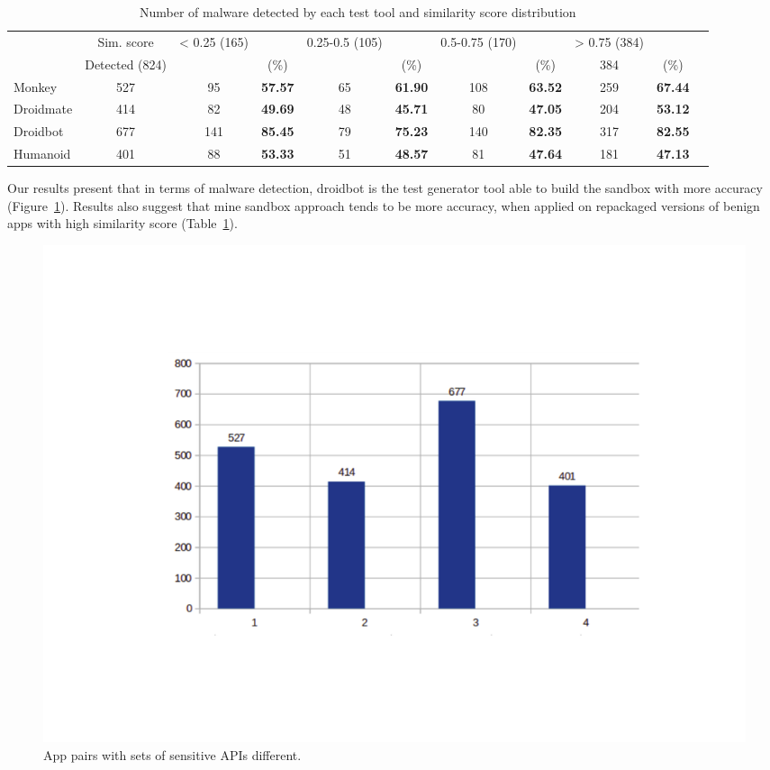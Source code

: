 \begin{table}[t]
  \caption{Number of malware detected by each test tool and similarity score distribution}
  \centering
  \begin{small}
 \begin{tabular}{lcccccccccc}
 \toprule 
    & Sim. score & < 0.25 (165) & & 0.25-0.5 (105) & & 0.5-0.75 (170) & & > 0.75 (384) & &\\  
    & Detected (824) &  & (\%) &  & (\%) &  & (\%) & 384 & (\%)\\  
    \midrule
   Monkey & 527  & 95 & \textbf{57.57} & 65 & \textbf{61.90} & 108 & \textbf{63.52} & 259 & \textbf{67.44}\\ 
   Droidmate &  414 & 82 & \textbf{49.69} & 48 & \textbf{45.71} & 80 & \textbf{47.05} & 204 & \textbf{53.12}\\ 
   Droidbot &  677 & 141 & \textbf{85.45} & 79 & \textbf{75.23} & 140 & \textbf{82.35} & 317 & \textbf{82.55}\\ 
   Humanoid &  401 & 88 & \textbf{53.33} & 51 & \textbf{48.57} & 81 & \textbf{47.64} & 181 & \textbf{47.13}\\ 
 \bottomrule
 \end{tabular}
 \end{small}
 \label{tab:mfb}
\end{table}

\begin{obs}{1}{}
   Our results present that in terms of malware detection, droidbot is the test generator tool able to build the sandbox with more accuracy (Figure~\ref{fig:accuracy}). Results also suggest that mine sandbox approach tends to be more accuracy, when applied on repackaged versions of benign apps with high similarity score (Table~\ref{tab:mfb}).
 \end{obs}

\begin{figure}[ht]
\centering
\includegraphics[scale=0.3]{images/accuracy.pdf}
\caption{App pairs with sets of sensitive APIs different.}
 \label{fig:accuracy}
\end{figure}

